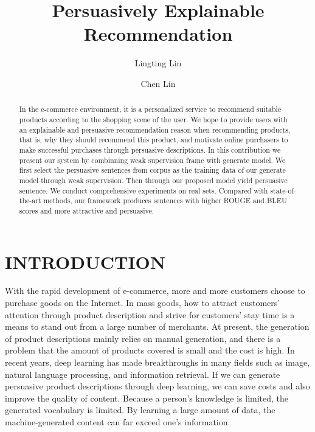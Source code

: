 \documentclass[sigconf]{acmart}
\begin{document}
\title{Persuasively Explainable Recommendation}

\author{Lingting Lin}

\author{Chen Lin}


\begin{abstract}
In the e-commerce environment, it is a personalized service to recommend suitable products according to the shopping scene of the user. We hope to provide users with an explainable and persuasive recommendation reason when recommending products, that is, why they should recommend this product, and motivate online purchasers to make successful purchases through persuasive descriptions. In this contribution we present our system by combinning weak supervision frame with generate model.  We first select the persuasive sentences from corpus as the training data of our generate model through weak supervision. Then through our proposed model yield persuasive sentence. We conduct comprehensive experiments on real sets. Compared with state-of-the-art methods, our framework produces sentences with higher ROUGE and BLEU scores and more attractive and persuasive.

\end{abstract}



\maketitle

\section{INTRODUCTION}
With the rapid development of e-commerce, more and more customers choose to purchase goods on the Internet. In mass goods, how to attract customers' attention through product description and strive for customers' stay time is a means to stand out from a large number of merchants. At present, the generation of product descriptions mainly relies on manual generation, and there is a problem that the amount of products covered is small and the cost is high. In recent years, deep learning has made breakthroughs in many fields such as image, natural language processing, and information retrieval. If we can generate persuasive product descriptions through deep learning, we can save costs and also improve the quality of content. Because a person's knowledge is limited, the generated vocabulary is limited. By learning a large amount of data, the machine-generated content can far exceed one's information.
\end{document}
